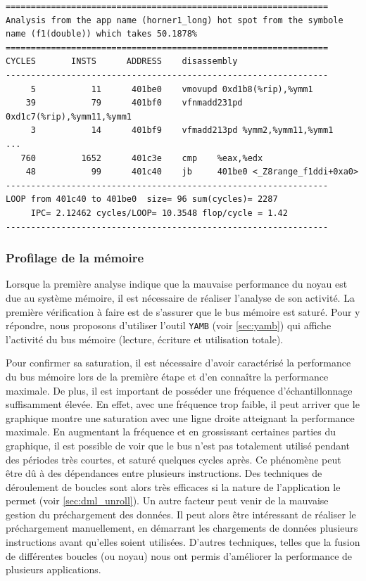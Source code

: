 \begin{minipage}[]{\linewidth}%
        \begin{lstlisting}[language={},caption={L'outil \texttt{OProfile++} permet d'extraire le code assembleur et d'y associer le compteur de cycles},label={lst:oprofileex}, 
  frame=tb]
================================================================
Analysis from the app name (horner1_long) hot spot from the symbole name (f1(double)) which takes 50.1878% 
================================================================
CYCLES       INSTS      ADDRESS    disassembly
----------------------------------------------------------------
     5           11      401be0    vmovupd 0xd1b8(%rip),%ymm1
    39           79      401bf0    vfnmadd231pd 0xd1c7(%rip),%ymm11,%ymm1
     3           14      401bf9    vfmadd213pd %ymm2,%ymm11,%ymm1
...
   760         1652      401c3e    cmp    %eax,%edx
    48           99      401c40    jb     401be0 <_Z8range_f1ddi+0xa0>
----------------------------------------------------------------
LOOP from 401c40 to 401be0  size= 96 sum(cycles)= 2287 
     IPC= 2.12462 cycles/LOOP= 10.3548 flop/cycle = 1.42 
----------------------------------------------------------------
\end{lstlisting}
\end{minipage}
        
        \subsubsection{Profilage de la mémoire}
            Lorsque la première analyse indique que la mauvaise performance du noyau est due au système mémoire, il est nécessaire de réaliser l'analyse de son activité. La première vérification à faire est de s'assurer que le bus mémoire est saturé. Pour y répondre, nous proposons d'utiliser l'outil \verb|YAMB| (voir \autoref{sec:yamb}) qui affiche l'activité du bus mémoire (lecture, écriture et utilisation totale). 
            
            Pour confirmer sa saturation, il est nécessaire d'avoir caractérisé la performance du bus mémoire lors de la première étape et d'en connaître la performance maximale. De plus, il est important de posséder une fréquence d'échantillonnage suffisamment élevée. En effet, avec une fréquence trop faible, il peut arriver que le graphique montre une saturation avec une ligne droite atteignant la performance maximale. En augmentant la fréquence et en grossissant certaines parties du graphique, il est possible de voir que le bus n'est pas totalement utilisé pendant des périodes très courtes, et saturé quelques cycles après. Ce phénomène peut être dû à des dépendances entre plusieurs instructions. Des techniques de déroulement de boucles sont alors très efficaces si la nature de l'application le permet (voir \autoref{sec:dml_unroll}). Un autre facteur peut venir de la mauvaise gestion du préchargement des données. Il peut alors être intéressant de réaliser le préchargement manuellement, en démarrant les chargements de données plusieurs instructions avant qu'elles soient utilisées. D'autres techniques, telles que la fusion de différentes boucles (ou noyau) nous ont permis d'améliorer la performance de plusieurs applications.
            
